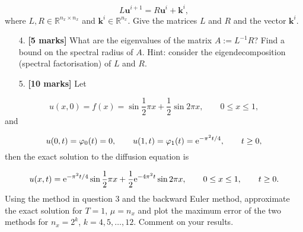 \documentclass[12pt,a4paper]{article}
\begin{document}
\[
L\mathbf{u}^{i+1} = R\mathbf{u}^{i} + \mathbf{k}^{i},
\]
where $L, R \in \mathbb{R}^{n_x \times n_x}$ and $\mathbf{k}^{i} \in \mathbb{R}^{n_x}$.  Give the matrices $L$ and $R$ and the vector $\mathbf{k}^{i}$.

\begin{itemize}
\item[4. ] \textbf{[5 marks]} What are the eigenvalues of the matrix $A := L^{-1}R$? Find a bound on the spectral radius of $A$.   Hint: consider the eigendecomposition (spectral factorisation) of $L$ and $R$.


\item[5. ] \textbf{[10 marks]} Let 

\end{itemize}
\[
u(x,0) = f(x) = \sin \frac{1}{2}\pi x + \frac{1}{2}\sin 2\pi x, \qquad 0 \leq x \leq 1, 
\]
and

\[
u(0,t) = \varphi_0(t) = 0, \qquad  u(1,t) = \varphi_1(t) = {\rm e}^{-\pi^2 t/4}, \qquad t \geq 0,
\]
then the exact solution to the diffusion equation is

\[
u(x,t) = {\rm e}^{-\pi^2 t/4}\sin \frac{1}{2}\pi x + \frac{1}{2}{\rm e}^{-4\pi^2 t}\sin 2\pi x, \qquad 0 \leq x \leq 1, \qquad t \geq 0.
\]
Using the method in question 3 and the backward Euler method, approximate the exact solution for $T = 1$, $\mu = n_x$ and plot the maximum error of the two methods for $n_x = 2^k$, $k = 4, 5, \ldots, 12$.  Comment on your results.
\end{document}
